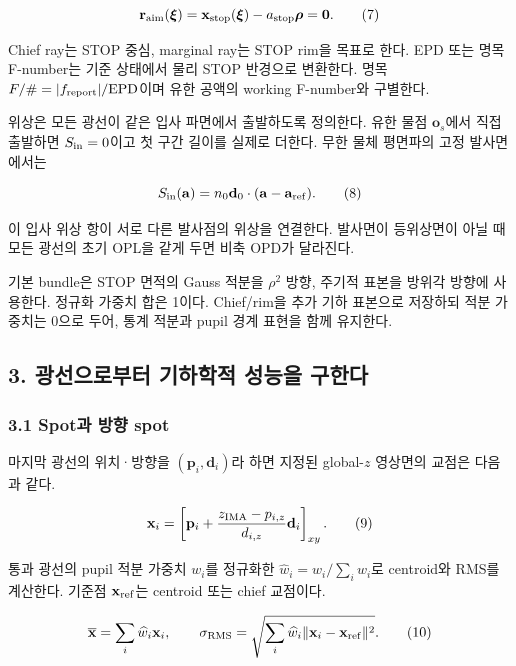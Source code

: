 \documentclass[
  a4paper,
]{article}
\begin{document}
\[
\mathbf r_{\rm aim}(\boldsymbol\xi)
 =\mathbf x_{\rm stop}(\boldsymbol\xi)-a_{\rm stop}\boldsymbol\rho=\mathbf0.
\tag{7}
\]

Chief ray는 STOP 중심, marginal ray는 STOP rim을 목표로 한다. EPD 또는
명목 F-number는 기준 상태에서 물리 STOP 반경으로 변환한다. 명목
\(F/\#=|f_{\rm report}|/\mathrm{EPD}\)이며 유한 공액의 working
F-number와 구별한다.

위상은 모든 광선이 같은 입사 파면에서 출발하도록 정의한다. 유한 물점
\(\mathbf o_s\)에서 직접 출발하면 \(S_{\rm in}=0\)이고 첫 구간 길이를
실제로 더한다. 무한 물체 평면파의 고정 발사면에서는

\[
S_{\rm in}(\mathbf a)=n_0\mathbf d_0\cdot(\mathbf a-\mathbf a_{\rm ref}).
\tag{8}
\]

이 입사 위상 항이 서로 다른 발사점의 위상을 연결한다. 발사면이
등위상면이 아닐 때 모든 광선의 초기 OPL을 같게 두면 비축 OPD가 달라진다.

기본 bundle은 STOP 면적의 Gauss 적분을 \(\rho^2\) 방향, 주기적 표본을
방위각 방향에 사용한다. 정규화 가중치 합은 1이다. Chief/rim을 추가 기하
표본으로 저장하되 적분 가중치는 0으로 두어, 통계 적분과 pupil 경계
표현을 함께 유지한다.

\hypertarget{uxad11uxc120uxc73cuxb85cuxbd80uxd130-uxae30uxd558uxd559uxc801-uxc131uxb2a5uxc744-uxad6cuxd55cuxb2e4}{%
\subsection{3. 광선으로부터 기하학적 성능을
구한다}\label{uxad11uxc120uxc73cuxb85cuxbd80uxd130-uxae30uxd558uxd559uxc801-uxc131uxb2a5uxc744-uxad6cuxd55cuxb2e4}}

\hypertarget{spotuxacfc-uxbc29uxd5a5-spot}{%
\subsubsection{3.1 Spot과 방향
spot}\label{spotuxacfc-uxbc29uxd5a5-spot}}

마지막 광선의 위치·방향을 \((\mathbf p_i,\mathbf d_i)\)라 하면 지정된
global-\(z\) 영상면의 교점은 다음과 같다.

\[
\mathbf x_i=\left[\mathbf p_i+
 \frac{z_{\rm IMA}-p_{i,z}}{d_{i,z}}\mathbf d_i\right]_{xy}.
\tag{9}
\]

통과 광선의 pupil 적분 가중치 \(w_i\)를 정규화한
\(\widehat w_i=w_i/\sum_iw_i\)로 centroid와 RMS를 계산한다. 기준점
\(\mathbf x_{\rm ref}\)는 centroid 또는 chief 교점이다.

\[
\overline{\mathbf x}=\sum_i\widehat w_i\mathbf x_i,\qquad
\sigma_{\rm RMS}=\sqrt{\sum_i\widehat w_i
 \|\mathbf x_i-\mathbf x_{\rm ref}\|^2}.
\tag{10}
\]
\end{document}
